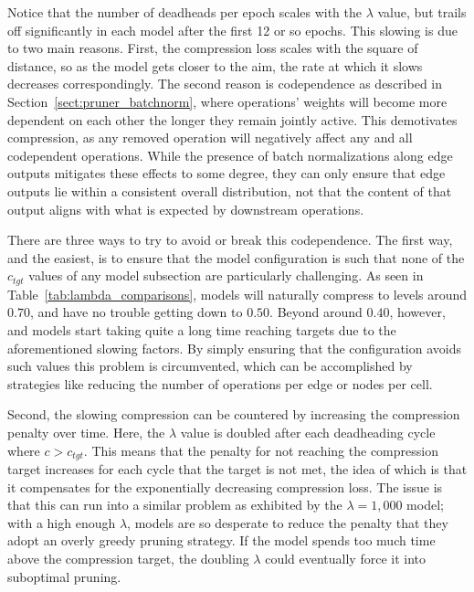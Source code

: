 Notice that the number of deadheads per epoch scales with the $\lambda$ value, but trails off significantly in each model
after the first 12 or so epochs. This slowing is due to two main reasons. First, the compression loss scales with the
square of distance, so as the model gets closer to the aim, the rate at which it slows decreases correspondingly. The second
reason is codependence as described in Section~\ref{sect:pruner_batchnorm}, where operations' weights will become more dependent on each
other the longer they remain jointly active. This demotivates compression, as any removed operation will negatively affect
any and all codependent operations. While the presence of batch normalizations along edge outputs mitigates these effects
to some degree, they can only ensure that edge outputs
lie within a consistent overall distribution, not that the content of that output aligns with what is expected by downstream
operations.

There are three ways to try to avoid or break this codependence. The first way, and the easiest, is to ensure that
the model configuration is such that none of the $c_{tgt}$ values of any model subsection are particularly challenging. As
seen in Table~\ref{tab:lambda_comparisons}, models will naturally compress to levels around $0.70$, and have no trouble
getting down to $0.50$. Beyond around $0.40$, however, and models start taking quite a long time reaching targets due to
the aforementioned slowing factors. By simply ensuring that the configuration avoids such values this problem is circumvented,
which can be accomplished by strategies like reducing the number of operations per edge or nodes per cell.

Second, the slowing compression can be countered by increasing
the compression penalty over time. Here, the $\lambda$ value is doubled after each deadheading cycle where
$c>c_{tgt}$. This means that the penalty for not reaching
the compression target increases for each cycle that the target is not met, the idea of which is that it compensates for
the exponentially decreasing compression loss. The issue is that this can run into a similar problem as exhibited by
the $\lambda=1,000$ model; with a high enough $\lambda$, models are so desperate
to reduce the penalty that they adopt an overly greedy pruning strategy. If the model spends too much time above the
compression target, the doubling $\lambda$ could eventually force it into suboptimal pruning.

